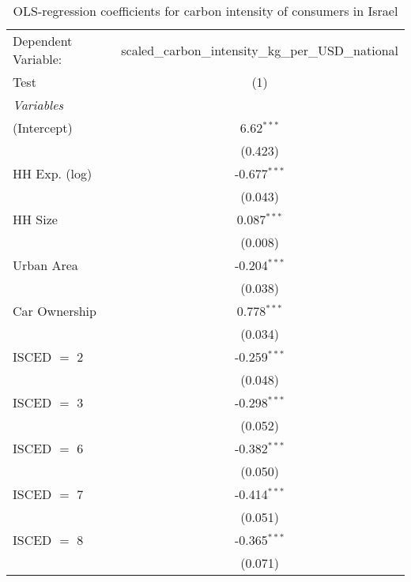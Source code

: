 
\begin{table}[htbp!]
   \centering
   \small
   \begin{adjustbox}{width = 1\textwidth, max height = 0.95\textheight, center}
      \begin{threeparttable}[b]
         \caption{\label{tab:OLS_1_ISR} OLS-regression coefficients for carbon intensity of consumers in Israel}
         \begin{tabular}{lc}
            \tabularnewline \midrule \midrule
            Dependent Variable: & scaled\_carbon\_intensity\_kg\_per\_USD\_national\\        
            Test                & (1)\\  
            \midrule
            \emph{Variables}\\
            (Intercept)         & 6.62$^{***}$\\   
                                & (0.423)\\   
            HH Exp. (log)       & -0.677$^{***}$\\   
                                & (0.043)\\   
            HH Size             & 0.087$^{***}$\\   
                                & (0.008)\\   
            Urban Area          & -0.204$^{***}$\\   
                                & (0.038)\\   
            Car Ownership       & 0.778$^{***}$\\   
                                & (0.034)\\   
            ISCED $=$ 2         & -0.259$^{***}$\\   
                                & (0.048)\\   
            ISCED $=$ 3         & -0.298$^{***}$\\   
                                & (0.052)\\   
            ISCED $=$ 6         & -0.382$^{***}$\\   
                                & (0.050)\\   
            ISCED $=$ 7         & -0.414$^{***}$\\   
                                & (0.051)\\   
            ISCED $=$ 8         & -0.365$^{***}$\\   
                                & (0.071)\\   

\end{tabular}
\end{threeparttable}
\end{adjustbox}
\end{table}
